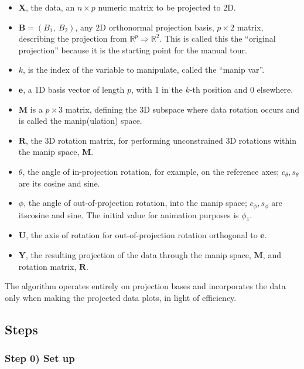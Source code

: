 \begin{itemize}
\tightlist
\item
  \(\textbf{X}\), the data, an \(n \times p\) numeric matrix to be
  projected to 2D.
\item
  \(\textbf{B} = (B_1,~ B_2)\), any 2D orthonormal projection basis,
  \(p \times 2\) matrix, describing the projection from
  \(\mathbb{R}^p \Rightarrow \mathbb{R}^2\). This is called this the
  ``original projection'' because it is the starting point for the
  manual tour.
\item
  \(k\), is the index of the variable to manipulate, called the ``manip
  var''. 
\item
  \(\textbf{e}\), a 1D basis vector of length \(p\), with 1 in the
  \(k\)-th position and 0 elsewhere.
\item
  \(\textbf{M}\) is a \(p \times 3\) matrix, defining the 3D subspace
  where data rotation occurs and is called the manip(ulation) space.
\item
  \(\textbf{R}\), the 3D rotation matrix, for performing unconstrained
  3D rotations within the manip space, \(\textbf{M}\).
\item
  \(\theta\), the angle of in-projection rotation, for example, on the
  reference axes; \(c_\theta, s_\theta\) are its cosine and sine.
\item
  \(\phi\), the angle of out-of-projection rotation, into the manip
  space; \(c_\phi, s_\phi\) are itscosine and sine. The initial value
  for animation purposes is \(\phi_1\).
\item
  \(\textbf{U}\), the axis of rotation for out-of-projection rotation
  orthogonal to \(\textbf{e}\).
\item
  \(\textbf{Y}\), the resulting projection of the data through the manip
  space, \(\textbf{M}\), and rotation matrix, \(\textbf{R}\). 
\end{itemize}

The algorithm operates entirely on projection bases and incorporates the
data only when making the projected data plots, in light of efficiency.

\hypertarget{steps}{%
\subsection{Steps}\label{steps}}

\hypertarget{step-0-set-up}{%
\subsubsection{Step 0) Set up}\label{step-0-set-up}}

